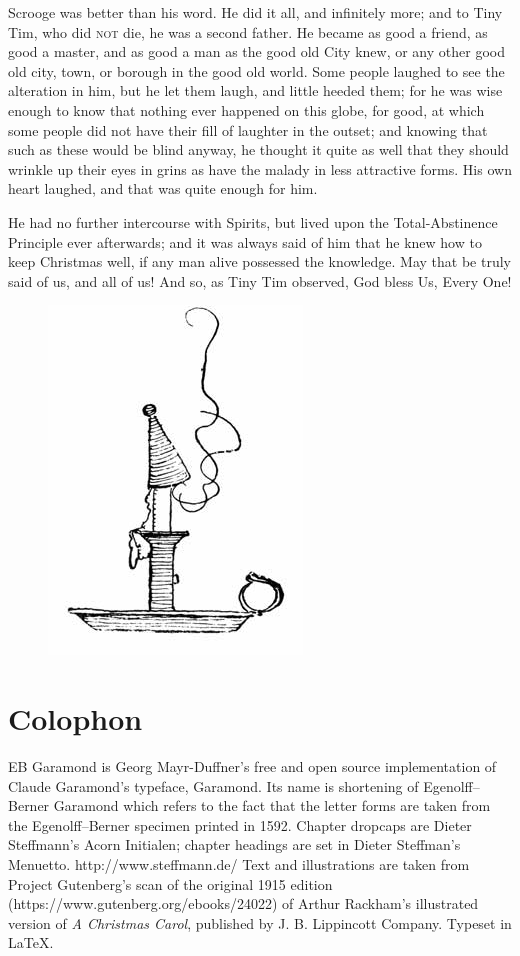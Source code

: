 \documentclass[paper=5.5in:8.5in,BCOR=15mm,twoside,DIV=15,headinclude=off,12pt,chapterprefix=off,openany,headings=huge]{scrbook} %
\begin{document}
Scrooge was better than his word. He did it all, and infinitely more; and to Tiny Tim, who did \textsc{not} die, he was a second father. He became as good a friend, as good a master, and as good a man as the good old City knew, or any other good old city, town, or borough in the good old world. Some people laughed to see the alteration in him, but he let them laugh, and little heeded them; for he was wise enough to know that nothing ever happened on this globe, for good, at which some people did not have their fill of laughter in the outset; and knowing that such as these would be blind anyway, he thought it quite as well that they should wrinkle up their eyes in grins as have the malady in less attractive forms. His own heart laughed, and that was quite enough for him.

He had no further intercourse with Spirits, but lived upon the Total-Abstinence Principle ever afterwards; and it was always said of him that he knew how to keep Christmas well, if any man alive possessed the knowledge. May that be truly said of us, and all of us! And so, as Tiny Tim observed, God bless Us, Every One!

\begin{figure}
\centering
\includegraphics[width=.5\linewidth]{gs182}
\end{figure}
\pagestyle{empty}
\chapter*{Colophon}
\centering
EB Garamond is Georg Mayr-Duffner's free and open source implementation of Claude Garamond’s typeface, Garamond. Its name is shortening of Egenolff–Berner Garamond which refers to the fact that the letter forms are taken from the Egenolff–Berner specimen printed in 1592.
\vfill
Chapter dropcaps are Dieter Steffmann's Acorn Initialen; chapter headings are set in Dieter Steffman's Menuetto. http://www.steffmann.de/
\vfill
Text and illustrations are taken from Project Gutenberg's scan of the original 1915 edition (https://www.gutenberg.org/ebooks/24022) of Arthur Rackham's illustrated version of \textit{A Christmas Carol}, published by J. B. Lippincott Company.
\vfill
Typeset in \LaTeX{}.
\end{document}

